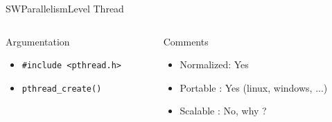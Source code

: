 %
\begin{Frame}{SWParallelismLevel Thread}
  \begin{columns}[t]
    \begin{column}{5cm} %
      \begin{block}{Argumentation}
        \begin{itemize}
        \item \texttt{\#include <pthread.h>}
        \item \texttt{pthread\_create()}
        \end{itemize}
      \end{block} 
    \end{column}
    
    \begin{column}{5cm} %
      \begin{alertblock}{Comments}
        \begin{itemize}
        \item Normalized: Yes 
        \item Portable : Yes (linux, windows, ...)
        \item Scalable : No, why ?
        \end{itemize}
      \end{alertblock}   
    \end{column}
  \end{columns}  
\end{Frame}


